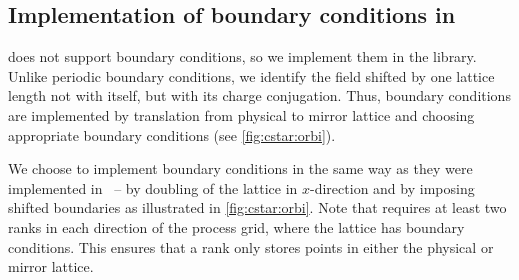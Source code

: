 \subsection{Implementation of \CstarHeading boundary conditions in \quda}
\label{sec:interface:cstar}

\Quda does not support \Cstar boundary conditions, so we implement them in the \quda library.
Unlike periodic boundary conditions, we identify the field shifted by one lattice length not with itself, but with its charge conjugation.
Thus, \Cstar boundary conditions are implemented by translation from physical to mirror lattice and choosing appropriate boundary conditions (see \cref{fig:cstar:orbi}).

%   

We choose to implement \Cstar boundary conditions in the same way as they were implemented in \openqxd\ -- by doubling of the lattice in $x$-direction and by imposing shifted boundaries as illustrated in \cref{fig:cstar:orbi}. Note that \openqxd requires at least two ranks in each direction of the process grid, where the lattice has \Cstar boundary conditions. This ensures that a rank only stores points in either the physical or mirror lattice.

